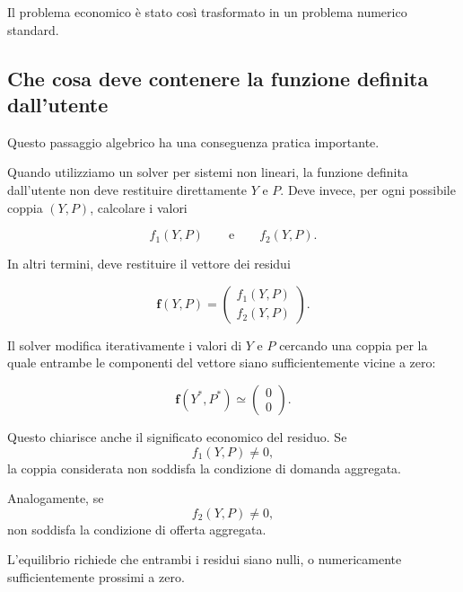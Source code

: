 Il problema economico è stato così trasformato in un problema
numerico standard.


\subsection{Che cosa deve contenere la funzione definita dall'utente}

Questo passaggio algebrico ha una conseguenza pratica importante.

Quando utilizziamo un solver per sistemi non lineari, la funzione
definita dall'utente non deve restituire direttamente $Y$ e $P$.
Deve invece, per ogni possibile coppia $(Y,P)$, calcolare i valori

\begin{equation*}
    f_1(Y,P)
    \qquad\text{e}\qquad
    f_2(Y,P).
\end{equation*}

In altri termini, deve restituire il vettore dei residui

\begin{equation*}
\mathbf{f}(Y,P)
=
\begin{pmatrix}
f_1(Y,P)\\
f_2(Y,P)
\end{pmatrix}.
\end{equation*}

Il solver modifica iterativamente i valori di $Y$ e $P$ cercando
una coppia per la quale entrambe le componenti del vettore siano
sufficientemente vicine a zero:

\begin{equation*}
    \mathbf{f}(Y^*,P^*)
    \simeq
    \begin{pmatrix}
        0\\
        0
    \end{pmatrix}.
\end{equation*}

Questo chiarisce anche il significato economico del residuo.
Se
\begin{equation*}
    f_1(Y,P)\neq0,
\end{equation*}
la coppia considerata non soddisfa la condizione di domanda
aggregata.

Analogamente, se
\begin{equation*}
    f_2(Y,P)\neq0,
\end{equation*}
non soddisfa la condizione di offerta aggregata.

L'equilibrio richiede che entrambi i residui siano nulli, o
numericamente sufficientemente prossimi a zero.


